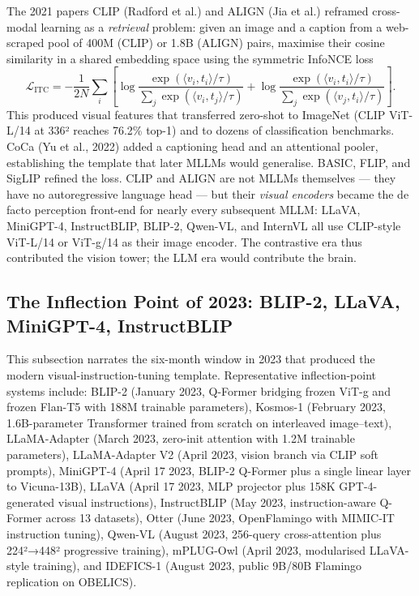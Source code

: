 The 2021 papers CLIP (Radford et al.) and ALIGN (Jia et al.) reframed cross-modal learning as a \emph{retrieval} problem: given an image and a caption from a web-scraped pool of 400M (CLIP) or 1.8B (ALIGN) pairs, maximise their cosine similarity in a shared embedding space using the symmetric InfoNCE loss
\[\mathcal{L}_{\text{ITC}} = -\frac{1}{2N}\sum_i \left[\log\frac{\exp(\langle v_i, t_i\rangle / \tau)}{\sum_j \exp(\langle v_i, t_j\rangle/\tau)} + \log\frac{\exp(\langle v_i, t_i\rangle/\tau)}{\sum_j \exp(\langle v_j, t_i\rangle/\tau)}\right].\]
This produced visual features that transferred zero-shot to ImageNet (CLIP ViT-L/14 at 336² reaches 76.2\% top-1) and to dozens of classification benchmarks. CoCa (Yu et al., 2022) added a captioning head and an attentional pooler, establishing the template that later MLLMs would generalise. BASIC, FLIP, and SigLIP refined the loss. CLIP and ALIGN are not MLLMs themselves --- they have no autoregressive language head --- but their \emph{visual encoders} became the de facto perception front-end for nearly every subsequent MLLM: LLaVA, MiniGPT-4, InstructBLIP, BLIP-2, Qwen-VL, and InternVL all use CLIP-style ViT-L/14 or ViT-g/14 as their image encoder. The contrastive era thus contributed the vision tower; the LLM era would contribute the brain.

\subsection{The Inflection Point of 2023: BLIP-2, LLaVA, MiniGPT-4, InstructBLIP}\label{the-inflection-point-of-2023-blip-2-llava-minigpt-4-instructblip}

This subsection narrates the six-month window in 2023 that produced the modern visual-instruction-tuning template. Representative inflection-point systems include: BLIP-2 (January 2023, Q-Former bridging frozen ViT-g and frozen Flan-T5 with 188M trainable parameters), Kosmos-1 (February 2023, 1.6B-parameter Transformer trained from scratch on interleaved image--text), LLaMA-Adapter (March 2023, zero-init attention with 1.2M trainable parameters), LLaMA-Adapter V2 (April 2023, vision branch via CLIP soft prompts), MiniGPT-4 (April 17 2023, BLIP-2 Q-Former plus a single linear layer to Vicuna-13B), LLaVA (April 17 2023, MLP projector plus 158K GPT-4-generated visual instructions), InstructBLIP (May 2023, instruction-aware Q-Former across 13 datasets), Otter (June 2023, OpenFlamingo with MIMIC-IT instruction tuning), Qwen-VL (August 2023, 256-query cross-attention plus 224²→448² progressive training), mPLUG-Owl (April 2023, modularised LLaVA-style training), and IDEFICS-1 (August 2023, public 9B/80B Flamingo replication on OBELICS).

